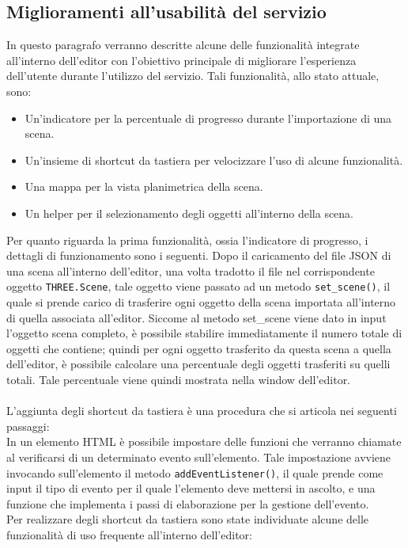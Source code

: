 \subsection{Miglioramenti all’usabilità del servizio}
\label{sec:chapter_creazione_scena_funzionalita_editor_usabilita}
In questo paragrafo verranno descritte alcune delle funzionalità integrate all’interno dell’editor con l’obiettivo principale di migliorare l’esperienza dell’utente durante l’utilizzo del servizio. Tali funzionalità, allo stato attuale, sono:
\begin{itemize}
\item Un’indicatore per la percentuale di progresso durante l’importazione di una scena.
\item Un’insieme di shortcut da tastiera per velocizzare l’uso di alcune funzionalità.
\item Una mappa per la vista planimetrica della scena.
\item Un helper per il selezionamento degli oggetti all’interno della scena.
\end{itemize}
Per quanto riguarda la prima funzionalità, ossia l’indicatore di progresso, i dettagli di funzionamento sono i seguenti. Dopo il caricamento del file JSON di una scena all’interno dell’editor, una volta tradotto il file nel corrispondente oggetto \texttt{THREE.Scene}, tale oggetto viene passato ad un metodo \texttt{set\_scene()}, il quale si prende carico di trasferire ogni oggetto della scena importata all’interno di quella associata all’editor. Siccome al metodo set\_scene viene dato in input l’oggetto scena completo, è possibile stabilire immediatamente il numero totale di oggetti che contiene; quindi per ogni oggetto trasferito da questa scena a quella dell’editor, è possibile calcolare una percentuale degli oggetti trasferiti su quelli totali. Tale percentuale viene quindi mostrata nella window dell’editor. 
\\
\\
L’aggiunta degli shortcut da tastiera è una procedura che si articola nei seguenti passaggi:
\\
In un elemento HTML è possibile impostare delle funzioni che verranno chiamate al verificarsi di un determinato evento sull’elemento. Tale impostazione avviene invocando sull’elemento il metodo \texttt{addEventListener()}, il quale prende come input il tipo di evento per il quale l’elemento deve mettersi in ascolto, e una funzione che implementa i passi di elaborazione per la gestione dell’evento.
\\
Per realizzare degli shortcut da tastiera sono state individuate alcune delle funzionalità di uso frequente all’interno dell’editor:
